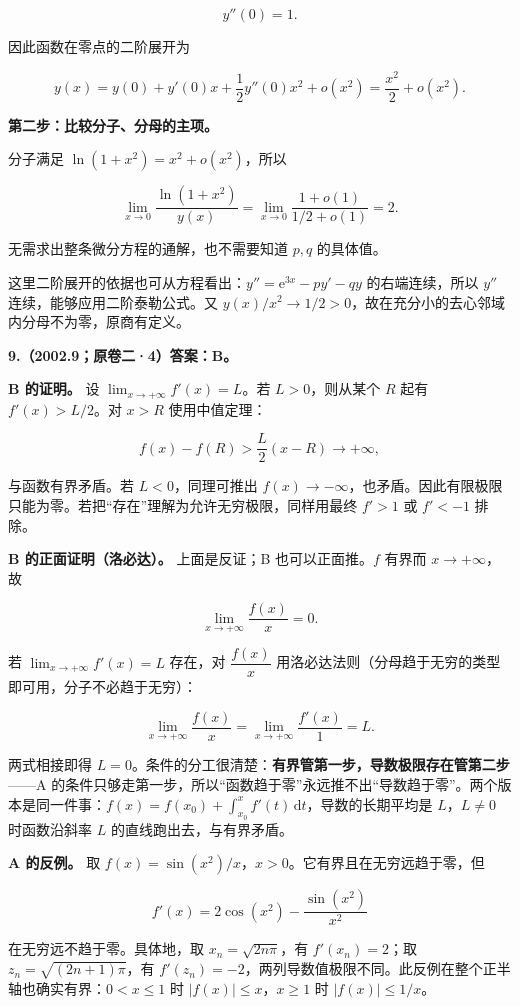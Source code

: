 \documentclass[UTF8,11pt,fontset=windows]{ctexart}
\begin{document}
$$
y''(0)=1.
$$

因此函数在零点的二阶展开为

$$
y(x)=y(0)+y'(0)x+\frac12y''(0)x^2+o(x^2)
=\frac{x^2}{2}+o(x^2).
$$

\textbf{第二步：比较分子、分母的主项。}

分子满足 $\ln(1+x^2)=x^2+o(x^2)$，所以

$$
\lim_{x\to0}\frac{\ln(1+x^2)}{y(x)}
=\lim_{x\to0}\frac{1+o(1)}{1/2+o(1)}=2.
$$

无需求出整条微分方程的通解，也不需要知道 $p,q$ 的具体值。

这里二阶展开的依据也可从方程看出：$y''=\mathrm e^{3x}-py'-qy$ 的右端连续，所以 $y''$ 连续，能够应用二阶泰勒公式。又 $y(x)/x^2\to1/2>0$，故在充分小的去心邻域内分母不为零，原商有定义。

\clearpage

\textbf{9.（2002.9；原卷二·4）答案：B。}

\textbf{B 的证明。} 设 $\lim_{x\to+\infty}f'(x)=L$。若 $L>0$，则从某个 $R$ 起有 $f'(x)>L/2$。对 $x>R$ 使用中值定理：

$$
f(x)-f(R)>\frac L2(x-R)\longrightarrow+\infty,
$$

与函数有界矛盾。若 $L<0$，同理可推出 $f(x)\to-\infty$，也矛盾。因此有限极限只能为零。若把“存在”理解为允许无穷极限，同样用最终 $f'>1$ 或 $f'<-1$ 排除。

\textbf{B 的正面证明（洛必达）。} 上面是反证；B 也可以正面推。$f$ 有界而 $x\to+\infty$，故

$$
\lim_{x\to+\infty}\frac{f(x)}{x}=0.
$$

若 $\lim_{x\to+\infty}f'(x)=L$ 存在，对 $\dfrac{f(x)}{x}$ 用洛必达法则（分母趋于无穷的类型即可用，分子不必趋于无穷）：

$$
\lim_{x\to+\infty}\frac{f(x)}{x}
=\lim_{x\to+\infty}\frac{f'(x)}{1}=L.
$$

两式相接即得 $L=0$。条件的分工很清楚：\textbf{有界管第一步，导数极限存在管第二步}——A 的条件只够走第一步，所以“函数趋于零”永远推不出“导数趋于零”。两个版本是同一件事：$f(x)=f(x_0)+\int_{x_0}^x f'(t)\,\mathrm dt$，导数的长期平均是 $L$，$L\ne0$ 时函数沿斜率 $L$ 的直线跑出去，与有界矛盾。

\textbf{A 的反例。} 取 $f(x)=\sin(x^2)/x$，$x>0$。它有界且在无穷远趋于零，但

$$
f'(x)=2\cos(x^2)-\frac{\sin(x^2)}{x^2}
$$

在无穷远不趋于零。具体地，取 $x_n=\sqrt{2n\pi}$，有 $f'(x_n)=2$；取 $z_n=\sqrt{(2n+1)\pi}$，有 $f'(z_n)=-2$，两列导数值极限不同。此反例在整个正半轴也确实有界：$0<x\le1$ 时 $|f(x)|\le x$，$x\ge1$ 时 $|f(x)|\le1/x$。
\end{document}
